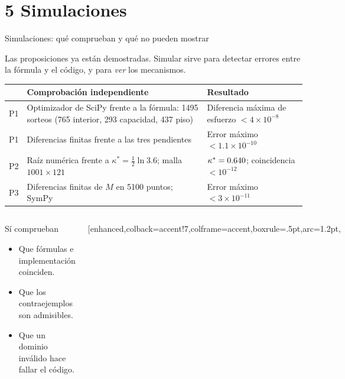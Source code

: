 \documentclass[aspectratio=169,10pt,t]{beamer}
\begin{document}
\section{5 Simulaciones}

\begin{frame}{Simulaciones: qué comprueban y qué no pueden mostrar}
\vspace{1mm}
{\small Las proposiciones ya están demostradas. Simular sirve para detectar errores entre
la fórmula y el código, y para \emph{ver} los mecanismos.\par}
\vspace{.3mm}
\small
\renewcommand{\arraystretch}{1.05}
\begin{tabular}{@{}>{\raggedright\arraybackslash}p{.05\linewidth}
  >{\raggedright\arraybackslash}p{.50\linewidth}
  >{\raggedright\arraybackslash}p{.36\linewidth}@{}}
\toprule & \textbf{Comprobación independiente} & \textbf{Resultado}\\\midrule
P1 & Optimizador de SciPy frente a la fórmula: 1495 sorteos (765 interior, 293
capacidad, 437 piso) &
Diferencia máxima de esfuerzo $<4\times10^{-8}$\\
P1 & Diferencias finitas frente a las tres pendientes &
Error máximo $<1.1\times10^{-10}$\\
P2 & Raíz numérica frente a $\kappa^{*}=\tfrac12\ln 3.6$; malla $1001\times121$ &
$\kappa^{*}=0.640$; coincidencia $<10^{-12}$\\
P3 & Diferencias finitas de $M$ en 5100 puntos; SymPy &
Error máximo $<3\times10^{-11}$\\\bottomrule
\end{tabular}
\vspace{1.2mm}
\begin{columns}[T,onlytextwidth]
\begin{propbox}{Sí comprueban}
\footnotesize
\begin{itemize}\setlength{\itemsep}{.3mm}
\item Que fórmulas e implementación coinciden.
\item Que los contraejemplos son admisibles.
\item Que un dominio inválido hace fallar el código.
\end{itemize}
\end{propbox}
\begin{tcolorbox}[enhanced,colback=accent!7,colframe=accent,boxrule=.5pt,arc=1.2pt,

\end{tcolorbox}
\end{columns}
\end{frame}
\end{document}
